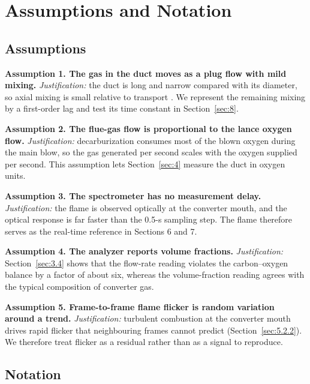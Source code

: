 \FloatBarrier
\section{Assumptions and Notation}\label{sec:2}

\subsection{Assumptions}\label{sec:2.1}

\textbf{Assumption 1. The gas in the duct moves as a plug flow with mild mixing.} \emph{Justification:} the duct is long and narrow compared with its diameter, so axial mixing is small relative to transport \cite{ref:10}. We represent the remaining mixing by a first-order lag and test its time constant in Section~\ref{sec:8}.

\textbf{Assumption 2. The flue-gas flow is proportional to the lance oxygen flow.} \emph{Justification:} decarburization consumes most of the blown oxygen during the main blow, so the gas generated per second scales with the oxygen supplied per second. This assumption lets Section~\ref{sec:4} measure the duct in oxygen units.

\textbf{Assumption 3. The spectrometer has no measurement delay.} \emph{Justification:} the flame is observed optically at the converter mouth, and the optical response is far faster than the 0.5-s sampling step. The flame therefore serves as the real-time reference in Sections 6 and 7.

\textbf{Assumption 4. The analyzer reports volume fractions.} \emph{Justification:} Section~\ref{sec:3.4} shows that the flow-rate reading violates the carbon–oxygen balance by a factor of about six, whereas the volume-fraction reading agrees with the typical composition of converter gas.

\textbf{Assumption 5. Frame-to-frame flame flicker is random variation around a trend.} \emph{Justification:} turbulent combustion at the converter mouth drives rapid flicker that neighbouring frames cannot predict (Section~\ref{sec:5.2.2}). We therefore treat flicker as a residual rather than as a signal to reproduce.

\subsection{Notation}\label{sec:2.2}


